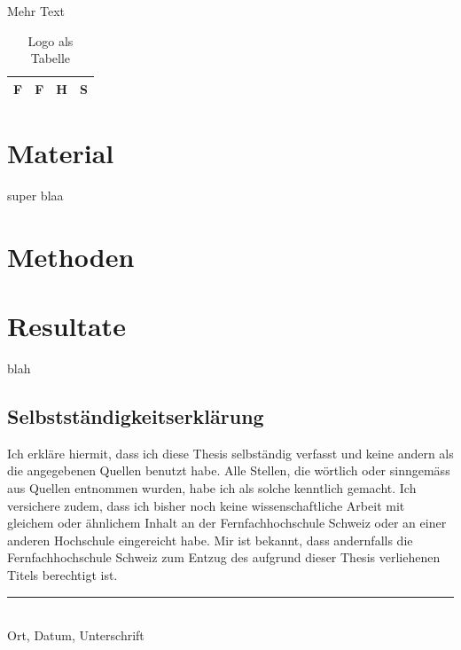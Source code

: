 \documentclass{ffhsthesis}
\begin{document}
Mehr Text
 
\begin{table}[ht]
  \begin{center}
  \begin{tabular}{|c|c|c|c|}
  \hline
  F & F & H & S \\
  \hline
  \end{tabular}
  \end{center}
  \caption{Logo als Tabelle}
\end{table}

\chapter{Material}

super blaa


\chapter{Methoden}

\chapter{Resultate}



\listoffigures

\listoftables

\begin{thebibliography}{XX}
 blah
\end{thebibliography}

% 

\newpage

\begin{appendix}


\chapter*{Selbstständigkeitserklärung}
Ich erkläre hiermit, dass ich diese Thesis selbständig verfasst 
und keine andern als die angegebenen Quellen benutzt habe. 
Alle Stellen, die wörtlich oder sinngemäss aus Quellen entnommen wurden, 
habe ich als solche kenntlich gemacht. Ich versichere zudem, dass ich bisher 
noch keine wissenschaftliche Arbeit mit gleichem oder ähnlichem Inhalt an der 
Fernfachhochschule Schweiz oder an einer anderen Hochschule eingereicht habe. 
Mir ist bekannt, dass andernfalls die Fernfachhochschule Schweiz zum Entzug 
des aufgrund dieser Thesis verliehenen Titels berechtigt ist.

\vspace{4cm}
\noindent
\hrule \ \\[-0.5ex]
Ort, Datum, Unterschrift
\end{appendix}
\end{document}
